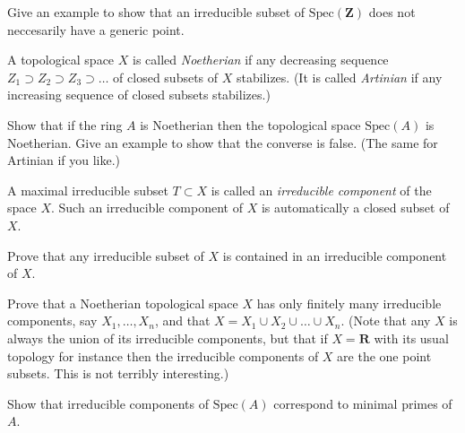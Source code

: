 \begin{exercise}
\label{exercise-irreducible-subset-not-generic}
Give an example to show that an irreducible
subset of $\text{Spec}(\mathbf{Z})$ does not neccesarily have a generic point.
\end{exercise}

\begin{definition}
\label{definition-Noetherian-space}
A topological space $X$ is called {\it Noetherian} if any
decreasing sequence $Z_1\supset Z_2 \supset Z_3\supset \ldots$
of closed subsets of $X$ stabilizes.
(It is called {\it Artinian} if any increasing sequence of closed
subsets stabilizes.)
\end{definition}

\begin{exercise}
\label{exercise-Noetherian-spec}
Show that if the ring $A$ is Noetherian then
the topological space $\text{Spec}(A)$ is Noetherian. Give an
example to show that the converse is false. (The same for
Artinian if you like.)
\end{exercise}

\begin{definition}
\label{definition-irreducible-component}
A maximal irreducible subset $T\subset X$ is called an
{\it irreducible component} of the space $X$. Such an irreducible
component of $X$ is automatically a closed subset of $X$.
\end{definition}

\begin{exercise}
\label{exercise-irreducible-in-irreducible}
Prove that any irreducible subset
of $X$ is contained in an irreducible component of $X$.
\end{exercise}

\begin{exercise}
\label{exercise-Noetherian-finite-nr-irreducible}
Prove that a Noetherian topological space $X$
has only finitely many irreducible components, say $X_1, \ldots, X_n$,
and that $X = X_1\cup X_2\cup\ldots\cup X_n$. (Note that
any $X$ is always the union of its irreducible components, but that
if $X = {\mathbf R}$ with its usual topology for instance then the irreducible
components of $X$ are the one point subsets. This is not
terribly interesting.)
\end{exercise}

\begin{exercise}
\label{exercise-irreducible-components-minimal-primes}
Show that irreducible components of $\text{Spec}(A)$
correspond to minimal primes of $A$.
\end{exercise}

